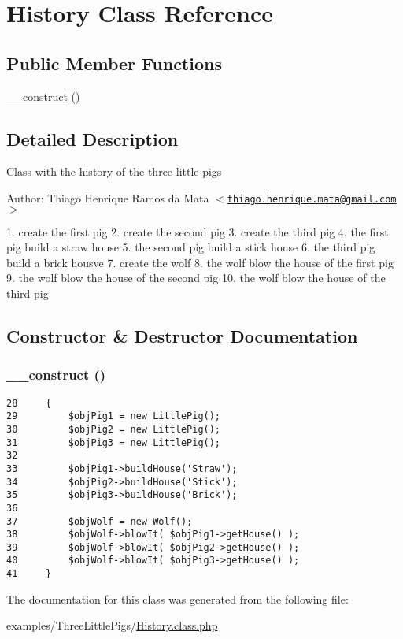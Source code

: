\hypertarget{class_history}{
\section{History Class Reference}
\label{class_history}
}
\subsection*{Public Member Functions}
\begin{CompactItemize}
\item 
\hyperlink{class_history_095c5d389db211932136b53f25f39685}{\_\-\_\-construct} ()
\end{CompactItemize}


\subsection{Detailed Description}
Class with the history of the three little pigs

\begin{Desc}
\item[Author:]Thiago Henrique Ramos da Mata $<$\href{mailto:thiago.henrique.mata@gmail.com}{\tt thiago.henrique.mata@gmail.com}$>$\end{Desc}
1. create the first pig 2. create the second pig 3. create the third pig 4. the first pig build a straw house 5. the second pig build a stick house 6. the third pig build a brick housve 7. create the wolf 8. the wolf blow the house of the first pig 9. the wolf blow the house of the second pig 10. the wolf blow the house of the third pig 

\subsection{Constructor \& Destructor Documentation}
\hypertarget{class_history_095c5d389db211932136b53f25f39685}{
\subsubsection[{\_\-\_\-construct}]{\setlength{\rightskip}{0pt plus 5cm}\_\-\_\-construct ()}}
\label{class_history_095c5d389db211932136b53f25f39685}




\begin{Code}\begin{verbatim}28     {
29         $objPig1 = new LittlePig();
30         $objPig2 = new LittlePig();
31         $objPig3 = new LittlePig();
32 
33         $objPig1->buildHouse('Straw');
34         $objPig2->buildHouse('Stick');
35         $objPig3->buildHouse('Brick');
36 
37         $objWolf = new Wolf();
38         $objWolf->blowIt( $objPig1->getHouse() );
39         $objWolf->blowIt( $objPig2->getHouse() );
40         $objWolf->blowIt( $objPig3->getHouse() );
41     }
\end{verbatim}
\end{Code}




The documentation for this class was generated from the following file:\begin{CompactItemize}
\item 
examples/ThreeLittlePigs/\hyperlink{_history_8class_8php}{History.class.php}\end{CompactItemize}
